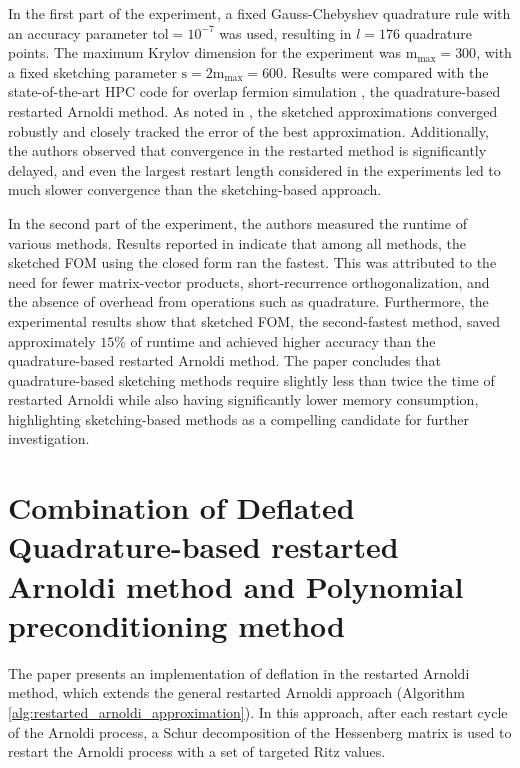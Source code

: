 In the first part of the experiment, a fixed Gauss-Chebyshev quadrature rule with an accuracy parameter $\text{tol} = 10^{-7}$ was used, resulting in $l = 176$ quadrature points. The maximum Krylov dimension for the experiment was $\text{m}_{\text{max}} = 300$, with a fixed sketching parameter $\text{s} = 2\text{m}_{\text{max}} = 600$. Results were compared with the state-of-the-art HPC code for overlap fermion simulation \cite{32}, the quadrature-based restarted Arnoldi method. As noted in \cite{41}, the sketched approximations converged robustly and closely tracked the error of the best approximation. Additionally, the authors observed that convergence in the restarted method is significantly delayed, and even the largest restart length considered in the experiments led to much slower convergence than the sketching-based approach.

In the second part of the experiment, the authors measured the runtime of various methods. Results reported in \cite{41} indicate that among all methods, the sketched FOM using the closed form ran the fastest. This was attributed to the need for fewer matrix-vector products, short-recurrence orthogonalization, and the absence of overhead from operations such as quadrature. Furthermore, the experimental results show that sketched FOM, the second-fastest method, saved approximately $15\%$ of runtime and achieved higher accuracy than the quadrature-based restarted Arnoldi method. The paper concludes that quadrature-based sketching methods require slightly less than twice the time of restarted Arnoldi while also having significantly lower memory consumption, highlighting sketching-based methods as a compelling candidate for further investigation.


\section{Combination of Deflated Quadrature-based restarted Arnoldi method and  Polynomial preconditioning method}
\label{sec:combo_def_quad_based_rest_arnoldi_poly_recond}

The paper \cite{56} presents an implementation of deflation in the restarted Arnoldi method, which extends the general restarted Arnoldi approach (Algorithm \ref{alg:restarted_arnoldi_approximation}). In this approach, after each restart cycle of the Arnoldi process, a Schur decomposition of the Hessenberg matrix is used to restart the Arnoldi process with a set of targeted Ritz values.

